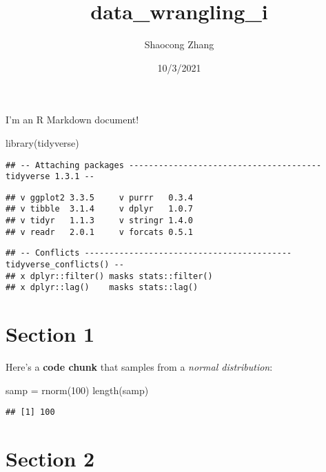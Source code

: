 \documentclass[
]{article}
\title{data\_wrangling\_i}
\author{Shaocong Zhang}
\date{10/3/2021}
\newenvironment{Shaded}{\begin{snugshade}}{\end{snugshade}}
\newcommand{\DecValTok}[1]{\textcolor[rgb]{0.00,0.00,0.81}{#1}}
\newcommand{\FunctionTok}[1]{\textcolor[rgb]{0.00,0.00,0.00}{#1}}
\newcommand{\NormalTok}[1]{#1}
\newcommand{\OtherTok}[1]{\textcolor[rgb]{0.56,0.35,0.01}{#1}}
\begin{document}
\maketitle

I'm an R Markdown document!

\begin{Shaded}
\begin{Highlighting}[]
\FunctionTok{library}\NormalTok{(tidyverse)}
\end{Highlighting}
\end{Shaded}

\begin{verbatim}
## -- Attaching packages --------------------------------------- tidyverse 1.3.1 --
\end{verbatim}

\begin{verbatim}
## v ggplot2 3.3.5     v purrr   0.3.4
## v tibble  3.1.4     v dplyr   1.0.7
## v tidyr   1.1.3     v stringr 1.4.0
## v readr   2.0.1     v forcats 0.5.1
\end{verbatim}

\begin{verbatim}
## -- Conflicts ------------------------------------------ tidyverse_conflicts() --
## x dplyr::filter() masks stats::filter()
## x dplyr::lag()    masks stats::lag()
\end{verbatim}

\hypertarget{section-1}{%
\section{Section 1}\label{section-1}}

Here's a \textbf{code chunk} that samples from a \emph{normal
distribution}:

\begin{Shaded}
\begin{Highlighting}[]
\NormalTok{samp }\OtherTok{=} \FunctionTok{rnorm}\NormalTok{(}\DecValTok{100}\NormalTok{)}
\FunctionTok{length}\NormalTok{(samp)}
\end{Highlighting}
\end{Shaded}

\begin{verbatim}
## [1] 100
\end{verbatim}

\hypertarget{section-2}{%
\section{Section 2}\label{section-2}}
\end{document}
